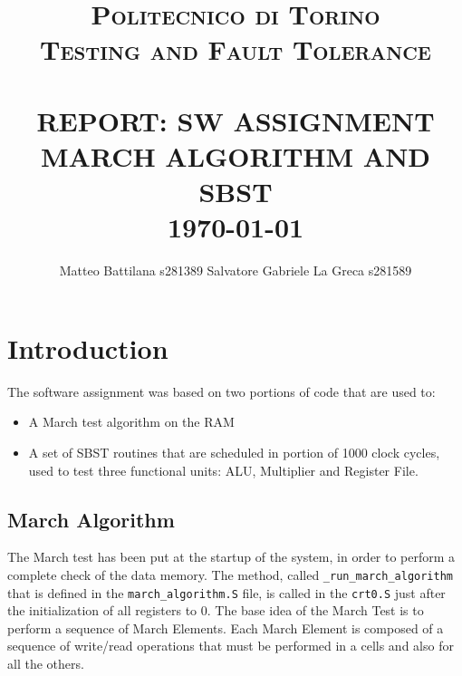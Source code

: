 \documentclass[paper=a4, fontsize=10pt]{scrartcl}	%
\title{	\normalsize \textsc{Politecnico di Torino\\Testing and Fault Tolerance} 	%
	\\[2.0cm]								%
	\HRule{0.5pt} \\						%
	\LARGE \textbf{\uppercase{Report: SW ASSIGNMENT\\March Algorithm and SBST}}	%
	\HRule{2pt} \\ [0.5cm]		%
	\normalsize 
	\today %
}
\author{
	Matteo Battilana s281389\newline
	Salvatore Gabriele La Greca s281589
}
\makeatletter
\def\printtitle{%
	{\centering \@title\par}}
\def\printauthor{%
	{\centering \large \@author}}
\makeatother
\begin{document}
	\thispagestyle{empty}		%
	
	\printtitle					%
	\vfill
	\printauthor				%
	\newpage
	\setcounter{page}{1}		%
	\section{Introduction}
	The software assignment was based on two portions of code that are used to:
	\begin{itemize}
		\itemsep0sp
		\item A March test algorithm on the RAM
		\item A set of SBST routines that are scheduled in portion of 1000 clock cycles, used to test three functional units: ALU, Multiplier and Register File.
	\end{itemize}

	\subsection{March Algorithm}
	The March test has been put at the startup of the system, in order to perform a complete check of the data memory.
	The method, called \texttt{\_run\_march\_algorithm} that is defined in the \texttt{march\_algorithm.S} file, is called in the \texttt{crt0.S} just after the initialization of all registers to 0.\newline\newline
	The base idea of the March Test is to perform a sequence of March Elements. Each March Element is composed of a sequence of write/read operations that must be performed in a cells and also for all the others.
	
\end{document}
